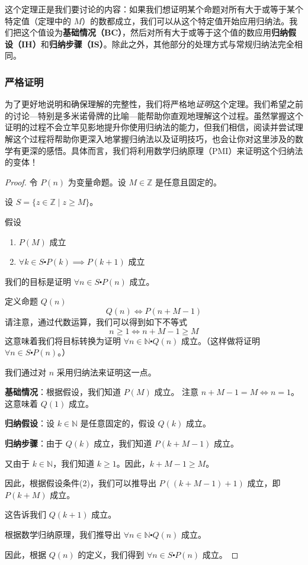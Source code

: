 这个定理正是我们要讨论的内容：如果我们想证明某个命题对所有大于或等于某个特定值（定理中的 $M$）的数都成立，我们可以从这个特定值开始应用归纳法。我们把这个值设为\textbf{基础情况（BC）}，然后对所有大于或等于这个值的数应用\textbf{归纳假设（IH）}和\textbf{归纳步骤（IS）}。除此之外，其他部分的处理方式与常规归纳法完全相同。

\subsubsection*{严格证明}

为了更好地说明和确保理解的完整性，我们将严格地\emph{证明}这个定理。我们希望之前的讨论---特别是多米诺骨牌的比喻---能帮助你直观地理解这个过程。虽然掌握这个证明的过程不会立竿见影地提升你使用归纳法的能力，但我们相信，阅读并尝试理解这个过程将帮助你更深入地掌握归纳法以及证明技巧，也会让你对这里涉及的数学有更深的感悟。具体而言，我们将利用数学归纳原理（PMI）来证明这个归纳法的变体！

\begin{proof}
    令 $P(n)$ 为变量命题。设 $M \in \mathbb{Z}$ 是任意且固定的。

    设 $S = \{z \in \mathbb{Z} \mid z \ge M\}$。

    假设
    \begin{enumerate}[label=(\arabic*)]
        \item $P(M)$ 成立
        \item $\forall k \in S \centerdot P(k) \implies P(k + 1)$ 成立
    \end{enumerate}

    我们的目标是证明 $\forall n \in S \centerdot P(n)$ 成立。

    定义命题 $Q(n)$
    \[Q(n) \iff P(n+M-1)\]
    请注意，通过代数运算，我们可以得到如下不等式
    \[n \ge 1 \iff n+M-1 \ge M\]
    这意味着我们将目标转换为证明 $\forall n \in \mathbb{N} \centerdot Q(n)$ 成立。（这样做将证明 $\forall n \in S \centerdot P(n)$。）
    
    我们通过对 $n$ 采用归纳法来证明这一点。

    \textbf{基础情况}：根据假设，我们知道 $P(M)$ 成立。 注意 $n + M - 1 = M \iff n = 1$。这意味着 $Q(1)$ 成立。

    \textbf{归纳假设}：设 $k \in \mathbb{N}$ 是任意固定的，假设 $Q(k)$ 成立。

    \textbf{归纳步骤}：由于 $Q(k)$ 成立，我们知道 $P(k + M - 1)$ 成立。

    又由于 $k \in \mathbb{N}$，我们知道 $k \ge 1$。因此，$k + M - 1 \ge M$。

    因此，根据假设条件(2)，我们可以推导出 $P((k+M-1)+1)$ 成立，即 $P(k + M)$ 成立。

    这告诉我们 $Q(k + 1)$ 成立。

    根据数学归纳原理，我们推导出 $\forall n \in \mathbb{N} \centerdot Q(n)$ 成立。

    因此，根据 $Q(n)$ 的定义，我们得到 $\forall n \in S \centerdot P(n)$ 成立。
\end{proof}

